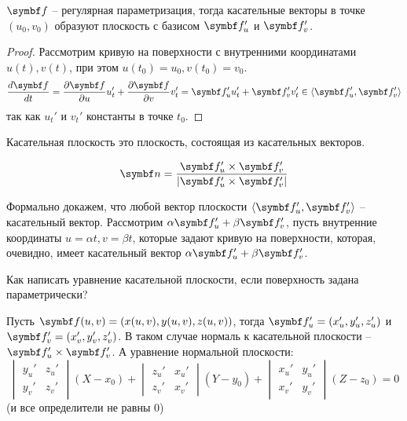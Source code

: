 \documentclass[main]{subfiles}
\begin{document}
\begin{theorem}
    $\vf$ -- регулярная параметризация, тогда касательные векторы в точке $(u_0, v_0)$ образуют плоскость с базисом $\vf_u'$ и $\vf_v'$.
\end{theorem}
\begin{proof}
    Рассмотрим кривую на поверхности с внутренними координатами $u(t), v(t)$,
    при этом $u(t_0) =u_0, v(t_0) = v_0$.
    \begin{gather*}
        \frac{d\vf}{dt} = \frac{\partial\vf}{\partial u} u_t' + \frac{\partial \vf}{\partial v} v_t' = \vf'_u u'_t + \vf_v' v_t' \in \langle \vf_u', \vf_v'\rangle
    \end{gather*}
    так как $u_t'$ и $v_t'$ константы в точке $t_0$.
\end{proof}
\begin{definition}
    Касательная плоскость это плоскость, состоящая из касательных векторов.
\end{definition}
\begin{definition}
    \[\vn = \frac{\vf_u' \times \vf_v'}{|\vf_u' \times \vf_v'|}\]
\end{definition}

Формально докажем, что любой вектор плоскости $\langle \vf_u', \vf_v'\rangle$ -- касательный вектор.
Рассмотрим $\alpha \vf_u' + \beta \vf_v'$, пусть внутренние координаты $u = \alpha t, v = \beta t$,
которые задают кривую на поверхности, которая, очевидно, имеет касательный вектор $\alpha \vf_u' + \beta \vf_v'$.

Как написать уравнение касательной плоскости, если поверхность задана параметрически?

Пусть $\vf(u,v) = (x(u,v), y(u,v), z(u,v))$, тогда $\vf_u' = (x_u', y_u', z_u')$ и $\vf_v' = (x_v', y_v', z_v')$.
В таком случае нормаль к касательной плоскости -- $\vf_u' \times \vf_v'$.
А уравнение нормальной плоскости:
\[\begin{vmatrix}
        y_u' & z_u' \\
        y_v' & z_v'
    \end{vmatrix} (X - x_0 ) +
    \begin{vmatrix}
        z_u' & x_u' \\
        z_v' & x_v'
    \end{vmatrix} (Y - y_0 ) +
    \begin{vmatrix}
        x_u' & y_u' \\
        x_v' & y_v'
    \end{vmatrix} (Z - z_0 ) = 0\]
(и все определители не равны 0)
\end{document}
